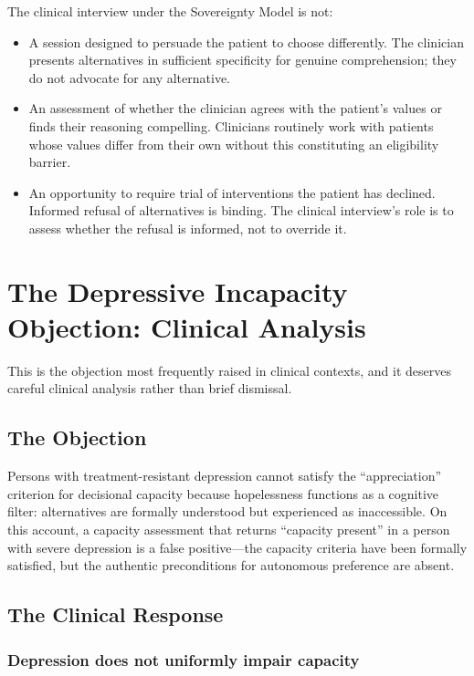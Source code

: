 \documentclass[11pt, letterpaper]{article}
\begin{document}
The clinical interview under the Sovereignty Model is not:

\begin{itemize}
  \item A session designed to persuade the patient to choose differently. The clinician
    presents alternatives in sufficient specificity for genuine comprehension; they do
    not advocate for any alternative.
  \item An assessment of whether the clinician agrees with the patient's values or
    finds their reasoning compelling. Clinicians routinely work with patients whose
    values differ from their own without this constituting an eligibility barrier.
  \item An opportunity to require trial of interventions the patient has declined.
    Informed refusal of alternatives is binding. The clinical interview's role is
    to assess whether the refusal is informed, not to override it.
\end{itemize}

\section{The Depressive Incapacity Objection: Clinical Analysis}

This is the objection most frequently raised in clinical contexts, and it deserves
careful clinical analysis rather than brief dismissal.

\subsection{The Objection}

Persons with treatment-resistant depression cannot satisfy the ``appreciation'' criterion
for decisional capacity because hopelessness functions as a cognitive filter: alternatives
are formally understood but experienced as inaccessible. On this account, a capacity
assessment that returns ``capacity present'' in a person with severe depression is a
false positive---the capacity criteria have been formally satisfied, but the authentic
preconditions for autonomous preference are absent.

\subsection{The Clinical Response}

\subsubsection{Depression does not uniformly impair capacity}
\end{document}

